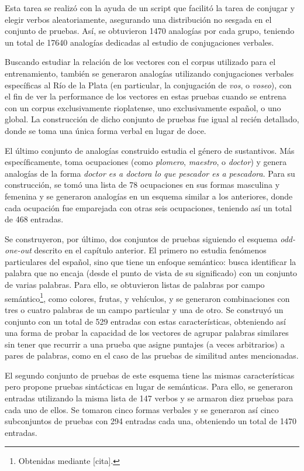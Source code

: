 Esta tarea se realizó con la ayuda de un script que facilitó la tarea de conjugar y elegir verbos
aleatoriamente, asegurando una distribución no sesgada en el conjunto de pruebas. Así, se obtuvieron
1470 analogías por cada grupo, teniendo un total de 17640 analogías dedicadas al estudio de
conjugaciones verbales.


Buscando estudiar la relación de los vectores con el corpus utilizado para el entrenamiento, también
se generaron analogías utilizando conjugaciones verbales específicas al Río de la Plata (en
particular, la conjugación de \textit{vos}, o \textit{voseo}), con el fin de ver la performance de
los vectores en estas pruebas cuando se entrena con un corpus exclusivamente rioplatense, uno
exclusivamente español, o uno global. La construcción de dicho conjunto de pruebas fue igual al
recién detallado, donde se toma una única forma verbal en lugar de doce.


El último conjunto de analogías construido estudia el género de sustantivos. Más específicamente,
toma ocupaciones (como \textit{plomero}, \textit{maestro}, o \textit{doctor}) y genera analogías de
la forma \textit{doctor es a doctora lo que pescador es a pescadora}. Para su construcción, se tomó
una lista de 78 ocupaciones en sus formas masculina y femenina y se generaron analogías en un
esquema similar a los anteriores, donde cada ocupación fue emparejada con otras seis ocupaciones,
teniendo así un total de 468 entradas.


Se construyeron, por último, dos conjuntos de pruebas siguiendo el esquema \textit{odd-one-out}
descrito en el capítulo anterior. El primero no estudia fenómenos particulares del español, sino que
tiene un enfoque semántico: busca identificar la palabra que no encaja (desde el punto de vista de
su significado) con un conjunto de varias palabras. Para ello, se obtuvieron listas de palabras por
campo semántico\footnote{Obtenidas mediante [cita].}, como colores, frutas, y vehículos, y se
generaron combinaciones con tres o cuatro palabras de un campo particular y una de otro. Se
construyó un conjunto con un total de 529 entradas con estas características, obteniendo así una
forma de probar la capacidad de los vectores de agrupar palabras similares sin tener que recurrir a
una prueba que asigne puntajes (a veces arbitrarios) a pares de palabras, como en el caso de las
pruebas de similitud antes mencionadas.

El segundo conjunto de pruebas de este esquema tiene las mismas características pero propone pruebas
sintácticas en lugar de semánticas. Para ello, se generaron entradas utilizando la misma lista de
147 verbos y se armaron diez pruebas para cada uno de ellos. Se tomaron cinco formas verbales y se
generaron así cinco subconjuntos de pruebas con 294 entradas cada una, obteniendo un total de 1470
entradas.

